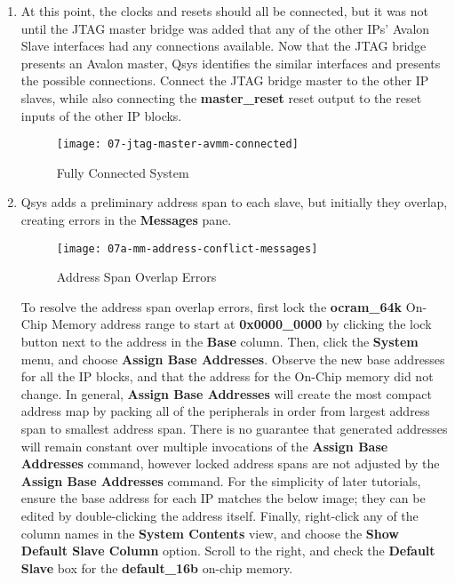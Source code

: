 \begin{flushleft}
\begin{enumerate}[
	label=\textbf{Step \arabic*.},
	leftmargin=*,
	widest={00},
	align=left]
\begin{enumerate}[
	label=\textbf{Step \arabic{enumi}\alph*.},
	leftmargin=*,
	align=left]
\end{enumerate}

\newpage

\item At this point, the clocks and resets should all be connected, but it was not until the JTAG master bridge was added that any of the other IPs' Avalon Slave interfaces had any connections available.  Now that the JTAG bridge presents an Avalon master, Qsys identifies the similar interfaces and presents the possible connections.  Connect the JTAG bridge master to the other IP slaves, while also connecting the \textbf{master\_reset} reset output to the reset inputs of the other IP blocks.

\begin{figure}[H]
\centering
\texttt{[image: 07-jtag-master-avmm-connected]}
\caption{Fully Connected System}
\label{fig:07-jtag-master-avmm-connected}
\end{figure}

\item Qsys adds a preliminary address span to each slave, but initially they overlap, creating errors in the \textbf{Messages} pane.

\begin{figure}[H]
\centering
\texttt{[image: 07a-mm-address-conflict-messages]}
\caption{Address Span Overlap Errors}
\label{fig:07a-mm-address-conflict-messages}
\end{figure}

To resolve the address span overlap errors, first lock the \textbf{ocram\_64k} On-Chip Memory address range to start at \textbf{0x0000\_0000} by clicking the lock button next to the address in the \textbf{Base} column.  Then, click the \textbf{System} menu, and choose \textbf{Assign Base Addresses}.  Observe the new base addresses for all the IP blocks, and that the address for the On-Chip memory did not change.  In general, \textbf{Assign Base Addresses} will create the most compact address map by packing all of the peripherals in order from largest address span to smallest address span.  There is no guarantee that generated addresses will remain constant over multiple invocations of the \textbf{Assign Base Addresses} command, however locked address spans are not adjusted by the \textbf{Assign Base Addresses} command.  For the simplicity of later tutorials, ensure the base address for each IP matches the below image; they can be edited by double-clicking the address itself.  Finally, right-click any of the column names in the \textbf{System Contents} view, and choose the \textbf{Show Default Slave Column} option.  Scroll to the right, and check the \textbf{Default Slave} box for the \textbf{default\_16b} on-chip memory.


\end{enumerate}
\end{flushleft}

